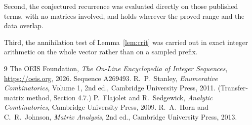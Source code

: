 \documentclass[11pt,a4paper]{article}
\theoremstyle{plain}
\theoremstyle{definition}
\begin{document}
Second, the conjectured recurrence was evaluated directly on those published terms, with no
matrices involved, and holds wherever the proved range and the data overlap.

Third, the annihilation test of Lemma~\ref{lem:crit} was carried out in exact integer
arithmetic on the whole vector rather than on a sampled prefix.

\begin{thebibliography}{9}
 The OEIS Foundation, \emph{The On-Line Encyclopedia of Integer
Sequences}, \url{https://oeis.org}, 2026. Sequence A269493.
 R.~P.~Stanley, \emph{Enumerative Combinatorics}, Volume 1, 2nd ed.,
Cambridge University Press, 2011. (Transfer-matrix method, Section 4.7.)
 P.~Flajolet and R.~Sedgewick, \emph{Analytic Combinatorics}, Cambridge
University Press, 2009.
 R.~A.~Horn and C.~R.~Johnson, \emph{Matrix Analysis}, 2nd ed., Cambridge
University Press, 2013.
\end{thebibliography}
\end{document}

